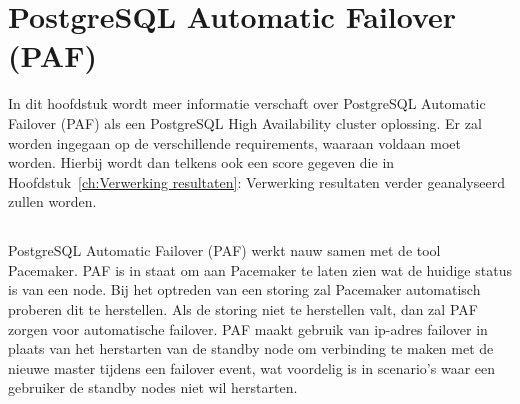 
\chapter{PostgreSQL Automatic Failover (PAF)}
\label{ch:PostgreSQL Automatic Failover (PAF)}

In dit hoofdstuk wordt meer informatie verschaft over PostgreSQL Automatic Failover (PAF) als een PostgreSQL High Availability cluster oplossing. Er zal worden ingegaan op de verschillende requirements, waaraan voldaan moet worden. Hierbij wordt dan telkens ook een score gegeven die in Hoofdstuk~\ref{ch:Verwerking resultaten}: Verwerking resultaten verder geanalyseerd zullen worden.



\section{}
\label{sec:Inleiding tot PostgreSQL Automatic Failover (PAF)}

\section{}
\label{sec:Requirements}

\subsection{}
\label{subsec:Must have}

PostgreSQL Automatic Failover (PAF) werkt nauw samen met de tool Pacemaker. PAF is in staat om aan Pacemaker te laten zien wat de huidige status is van een node. Bij het optreden van een storing zal Pacemaker automatisch proberen dit te herstellen.
Als de storing niet te herstellen valt, dan zal PAF zorgen voor automatische failover. PAF maakt gebruik van ip-adres failover in plaats van het herstarten van de standby node om verbinding te maken met de nieuwe master tijdens een failover event, wat voordelig is in scenario's waar een gebruiker de standby nodes niet wil herstarten.

